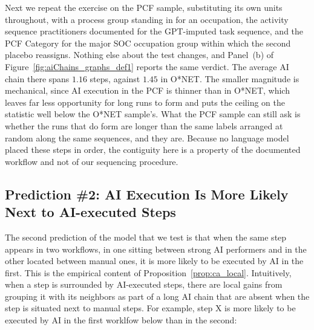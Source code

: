 Next we repeat the exercise on the PCF sample, substituting its own units throughout, with a process group standing in for an occupation, the activity sequence practitioners documented for the GPT-imputed task sequence, and the PCF Category for the major SOC occupation group within which the second placebo reassigns.
Nothing else about the test changes, and Panel~(b) of Figure~\ref{fig:aiChains_graphs_def1} reports the same verdict.
The average AI chain there spans $1.16$ steps, against $1.45$ in O*NET.
The smaller magnitude is mechanical, since AI execution in the PCF is thinner than in O*NET, which leaves far less opportunity for long runs to form and puts the ceiling on the statistic well below the O*NET sample's.
What the PCF sample can still ask is whether the runs that do form are longer than the same labels arranged at random along the same sequences, and they are.
Because no language model placed these steps in order, the contiguity here is a property of the documented workflow and not of our sequencing procedure.



\subsection{Prediction \#2: AI Execution Is More Likely Next to AI-executed Steps}
\label{sec:DWA_prediction}

The second prediction of the model that we test is that when the same step appears in two workflows, in one sitting between strong AI performers and in the other located between manual ones, it is more likely to be executed by AI in the first.
This is the empirical content of Proposition~\ref{prop:ca_local}.
Intuitively, when a step is surrounded by AI-executed steps, there are local gains from grouping it with its neighbors as part of a long AI chain that are absent when the step is situated next to manual steps.
For example, step X is more likely to be executed by AI in the first worklfow below than in the second:

\vspace{0.6em}

\vspace{-1.4em}

